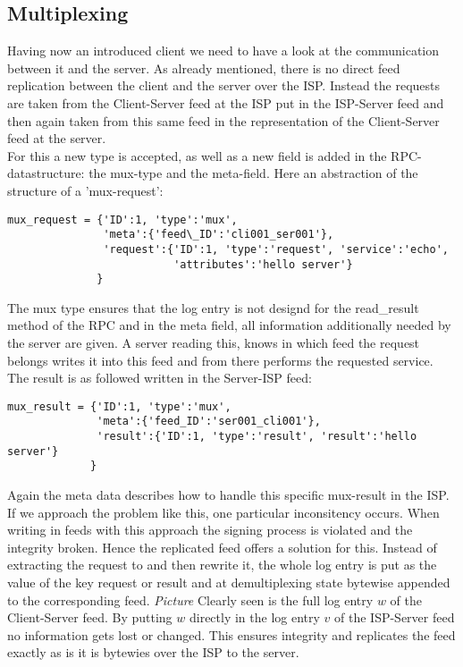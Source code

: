 \subsection{Multiplexing}
Having now an introduced client we need to have a look at the communication between it and the server. As already mentioned, there is no direct feed replication between the client and the server over the ISP. Instead the requests are taken from the Client-Server feed at the ISP put in the ISP-Server feed and then again taken from this same feed in the representation of the Client-Server feed at the server.\\
For this a new type is accepted, as well as a new field is added in the RPC-datastructure: the mux-type and the meta-field. Here an abstraction of the structure of a 'mux-request':\\
\begin{lstlisting}
mux_request = {'ID':1, 'type':'mux', 
               'meta':{'feed\_ID':'cli001_ser001'},
               'request':{'ID':1, 'type':'request', 'service':'echo', 
                          'attributes':'hello server'}
              }
\end{lstlisting}
The mux type ensures that the log entry is not designd for the read\_result method of the RPC and in the meta field, all information additionally needed by the server are given. A server reading this, knows in which feed the request belongs writes it into this feed and from there performs the requested service. The result is as followed written in the Server-ISP feed:\\
\begin{lstlisting}
mux_result = {'ID':1, 'type':'mux', 
              'meta':{'feed_ID':'ser001_cli001'},
              'result':{'ID':1, 'type':'result', 'result':'hello server'}
             }
\end{lstlisting}
Again the meta data describes how to handle this specific mux-result in the ISP.
If we approach the problem like this, one particular inconsitency occurs. When writing in feeds with this approach the signing process is violated and the integrity broken. Hence the replicated feed offers a solution for this. Instead of extracting the request to and then rewrite it, the whole log entry is put as the value of the key request or result and at demultiplexing state bytewise appended to the corresponding feed.
\textit{Picture}
Clearly seen is the full log entry $w$ of the Client-Server feed. By putting $w$ directly in the log entry $v$ of the ISP-Server feed no information gets lost or changed. This ensures integrity and replicates the feed exactly as is it is bytewies over the ISP to the server.
